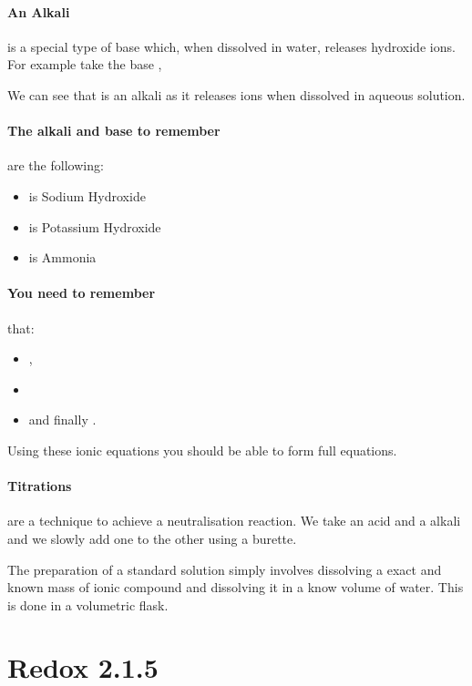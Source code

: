 	\paragraph{An Alkali} is a special type of base which, when dissolved in water, releases hydroxide ions.
	For example take the base ,
	\begin{center}
	\end{center}
	We can see that  is an alkali as it releases  ions when dissolved in aqueous solution.
	
	\paragraph{The alkali and base to remember} are the following:
	\begin{itemize}
		\item {} is Sodium Hydroxide
		\item {} is Potassium Hydroxide
		\item {} is Ammonia
	\end{itemize}
    \paragraph{You need to remember} that:
   \begin{itemize}
\item{}, 
\item   {} 
\item   and finally .
	\end{itemize} 
    Using these ionic equations you should be able to form full equations.
	
	\paragraph{Titrations} are a technique to achieve a neutralisation reaction.
	We take an acid and a alkali and we slowly add one to the other using a burette.
	
	
	The preparation of a standard solution simply involves dissolving a exact and known mass of ionic compound and dissolving it in a know volume of water.
	This is done in a volumetric flask.
    \section{Redox 2.1.5}

